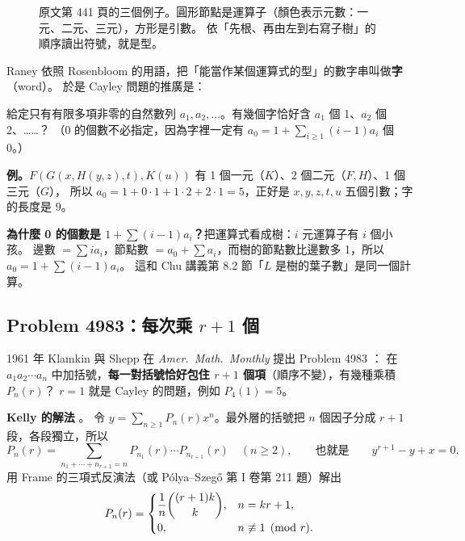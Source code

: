 \begin{figure}[H]
\centering
\RanIntroTrees
\caption{原文第 441 頁的三個例子。圓形節點是運算子（顏色表示元數：\textcolor{cU}{一元}、\textcolor{cA}{二元}、\textcolor{cB}{三元}），方形是引數。
依「先根、再由左到右寫子樹」的順序讀出符號，就是型。}
\label{fig:intro}
\end{figure}

Raney 依照 Rosenbloom 的用語，把「能當作某個運算式的型」的數字串叫做\textbf{字}（word）。
於是 Cayley 問題的推廣是：

\begin{thmbox}
給定只有有限多項非零的自然數列 $a_1,a_2,\ldots$。有幾個字恰好含 $a_1$ 個 1、$a_2$ 個 2、……？
（0 的個數不必指定，因為字裡一定有 $a_0=1+\sum_{i\ge1}(i-1)a_i$ 個 0。）
\end{thmbox}

\textbf{例。}$F(G(x,H(y,z),t),K(u))$ 有 1 個一元（$K$）、2 個二元（$F,H$）、1 個三元（$G$），
所以 $a_0=1+0\cdot1+1\cdot2+2\cdot1=5$，正好是 $x,y,z,t,u$ 五個引數；字的長度是 $9$。

\textbf{為什麼 0 的個數是 $1+\sum(i-1)a_i$？}把運算式看成樹：$i$ 元運算子有 $i$ 個小孩。
邊數 $=\sum ia_i$，節點數 $=a_0+\sum a_i$，而樹的節點數比邊數多 1，所以 $a_0=1+\sum(i-1)a_i$。
這和 Chu 講義第 8.2 節「$L$ 是樹的葉子數」是同一個計算。

\subsection{Problem 4983：每次乘 $r+1$ 個}

1961 年 Klamkin 與 Shepp 在 \emph{Amer.\ Math.\ Monthly} 提出 Problem 4983 ：
在 $a_1a_2\cdots a_n$ 中加括號，\textbf{每一對括號恰好包住 $r+1$ 個項}（順序不變），有幾種乘積 $P_n(r)$？
$r=1$ 就是 Cayley 的問題，例如 $P_4(1)=5$。

\textbf{Kelly 的解法} 。
令 $y=\sum_{n\ge1}P_n(r)x^n$。最外層的括號把 $n$ 個因子分成 $r+1$ 段，各段獨立，所以
\[
P_n(r)=\sum_{n_1+\cdots+n_{r+1}=n}P_{n_1}(r)\cdots P_{n_{r+1}}(r)\quad(n\ge2),
\qquad\text{也就是}\qquad y^{r+1}-y+x=0 .
\]
用 Frame 的三項式反演法（或 Pólya--Szegő 第 I 卷第 211 題）解出
\[
P_n(r)=\begin{cases}\dfrac1n\dbinom{(r+1)k}{k}, & n=kr+1,\\[6pt] 0, & n\not\equiv1\pmod r.\end{cases}
\]

\begin{table}[H]
\centering
\RanKellyTable
\caption{$P_n(r)$ 的值（公式與直接數括號兩種算法一致）。$r=1$ 是卡塔蘭數。}
\label{tab:kelly}
\end{table}

